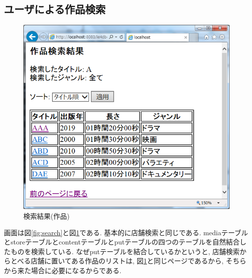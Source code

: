\documentclass{jarticle}
\begin{document}
\subsection{ユーザによる作品検索}
\begin{figure}[tp]
\begin{center}
\includegraphics[scale=0.5]{result_media.png}
\end{center}
\caption{検索結果(作品)}
\label{fig:result_media}
\end{figure}
画面は図\ref{fig:search}と図\ref{fig:result_media}である. 基本的に店舗検索と同じである. mediaテーブルとstoreテーブルとcontentテーブルとputテーブルの四つのテーブルを自然結合したものを検索している. なぜputテーブルを結合しているかというと, 店舗検索からとべる店舗に置いてある作品のリストは, 図\ref{fig:result_media}と同じページであるから, そちらから来た場合に必要になるからである.
\end{document}
